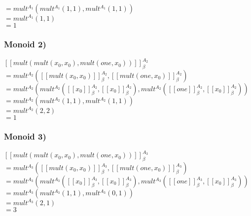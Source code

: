 $= mult^{A_1}(mult^{A_1}(1 , 1), mult^{A_1}( 1 , 1 )) $\\

$= mult^{A_1}(1, 1)$\\

$= 1$\\

\subsubsection*{Monoid 2)}

$[[mult(mult(x_0 ,x_0), mult(one,x_0 )) ]]^{A_2}_{\beta}$\\

$= mult^{A_2}([[mult(x_0 ,x_0)]]^{A_2}_{\beta}, [[mult(one,x_0 ) ]]^{A_2}_{\beta})$\\

$= mult^{A_2}(
mult^{A_2}(
[[x_0 ]]^{A_2}_{\beta} , [[x_0 ]]^{A_2}_{\beta}
), mult^{A_2}( 
[[one]]^{A_2}_{\beta} , [[x_0]]^{A_2}_{\beta} )) $\\

$= mult^{A_2}(mult^{A_2}(1 , 1), mult^{A_2}( 1 , 1 )) $\\

$= mult^{A_2}(2, 2)$\\

$= 1$\\

\subsubsection*{Monoid 3)}

$[[mult(mult(x_0 ,x_0), mult(one,x_0 )) ]]^{A_3}_{\beta}$\\

$= mult^{A_3}([[mult(x_0 ,x_0)]]^{A_3}_{\beta}, [[mult(one,x_0 ) ]]^{A_3}_{\beta})$\\

$= mult^{A_3}(
mult^{A_3}(
[[x_0 ]]^{A_3}_{\beta} , [[x_0 ]]^{A_3}_{\beta}
), mult^{A_3}( 
[[one]]^{A_3}_{\beta} , [[x_0]]^{A_3}_{\beta} )) $\\

$= mult^{A_3}(mult^{A_3}(1 , 1), mult^{A_3}( 0 , 1 )) $\\

$= mult^{A_3}(2, 1)$\\

$= 3$\\